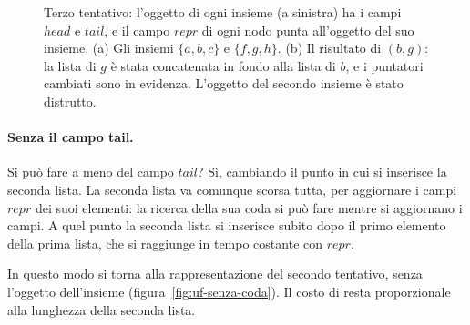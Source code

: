 \begin{figure}[htbp]
\caption{Terzo tentativo: l'oggetto di ogni insieme (a sinistra) ha i campi $\mathit{head}$ e $\mathit{tail}$, e il campo $\mathit{repr}$ di ogni nodo punta all'oggetto del suo insieme. (a) Gli insiemi $\{a,b,c\}$ e $\{f,g,h\}$. (b) Il risultato di \Union$(b,g)$: la lista di $g$ è stata concatenata in fondo alla lista di $b$, e i puntatori cambiati sono in evidenza. L'oggetto del secondo insieme è stato distrutto.}
\label{fig:uf-coda}
\end{figure}

\paragraph{Senza il campo tail.}
Si può fare a meno del campo $\mathit{tail}$? Sì, cambiando il punto in cui si inserisce la seconda lista. La seconda lista va comunque scorsa tutta, per aggiornare i campi $\mathit{repr}$ dei suoi elementi: la ricerca della sua coda si può fare mentre si aggiornano i campi. A quel punto la seconda lista si inserisce subito dopo il primo elemento della prima lista, che si raggiunge in tempo costante con $\mathit{repr}$.

In questo modo si torna alla rappresentazione del secondo tentativo, senza l'oggetto dell'insieme (figura~\ref{fig:uf-senza-coda}). Il costo di \Union{} resta proporzionale alla lunghezza della seconda lista.

